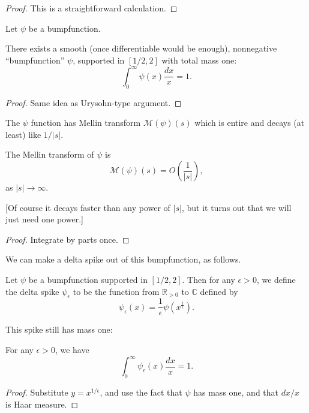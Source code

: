 \begin{proof}
This is a straightforward calculation.
\end{proof}



Let $\psi$ be a bumpfunction.
\begin{theorem}\label{SmoothExistence}
There exists a smooth (once differentiable would be enough), nonnegative ``bumpfunction'' $\psi$,
 supported in $[1/2,2]$ with total mass one:
$$
\int_0^\infty \psi(x)\frac{dx}{x} = 1.
$$
\end{theorem}
\begin{proof}
Same idea as Urysohn-type argument.
\end{proof}



The $\psi$ function has Mellin transform $\mathcal{M}(\psi)(s)$ which is entire and decays (at least) like $1/|s|$.
\begin{theorem}\label{MellinOfPsi}
The Mellin transform of $\psi$ is
$$\mathcal{M}(\psi)(s) =  O\left(\frac{1}{|s|}\right),$$
as $|s|\to\infty$.
\end{theorem}

[Of course it decays faster than any power of $|s|$, but it turns out that we will just need one power.]



\begin{proof}
Integrate by parts once.
\end{proof}



We can make a delta spike out of this bumpfunction, as follows.
\begin{definition}\label{DeltaSpike}
Let $\psi$ be a bumpfunction supported in $[1/2,2]$. Then for any $\epsilon>0$, we define the delta spike $\psi_\epsilon$ to be the function from $\mathbb{R}_{>0}$ to $\mathbb{C}$ defined by
$$\psi_\epsilon(x) = \frac{1}{\epsilon}\psi\left(x^{\frac{1}{\epsilon}}\right).$$
\end{definition}

This spike still has mass one:
\begin{lemma}\label{DeltaSpikeMass}
For any $\epsilon>0$, we have
$$\int_0^\infty \psi_\epsilon(x)\frac{dx}{x} = 1.$$
\end{lemma}



\begin{proof}
Substitute $y=x^{1/\epsilon}$, and use the fact that $\psi$ has mass one, and that $dx/x$ is Haar measure.
\end{proof}




